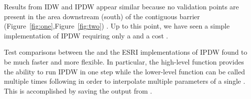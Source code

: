 \documentclass[nojss,shortnames]{jss}
\begin{document}
Results from IDW and IPDW appear similar because no validation points are present in the area downstream (south) of the contiguous barrier (Figure~\ref{fig:one},Figure~\ref{fig:two}) . Up to this point, we have seen a simple implementation of IPDW requiring only a  and a cost . 

Test comparisons between the  and the ESRI \citep{mitchell2012,suominen2010} implementations of IPDW found  to be much faster and more flexible. In particular, the high-level function  provides the ability to run IPDW in one step while the lower-level function  can be called multiple times following  in order to interpolate multiple parameters of a single . This is accomplished by saving the output from .
\setlength{\bibsep}{0pt}


\end{document}
